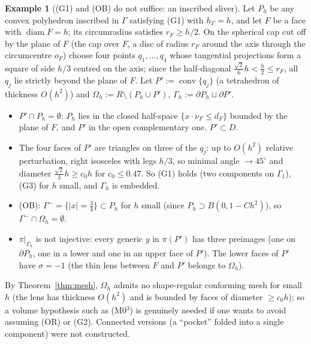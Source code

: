 \documentclass[11pt]{article}
\theoremstyle{definition}
\newtheorem{example}[theorem]{Example}
\newcommand{\hG}{h_\Gamma}
\newcommand{\Gh}{\Gamma_h}
\newcommand{\Oh}{\Omega_h}
\DeclareMathOperator{\diam}{diam}
\begin{document}
\begin{example}[(G1) and (OB) do not suffice: an inscribed sliver]\label{ex:sliver}
Let $P_h$ be any convex polyhedron inscribed in $\Gamma$ satisfying (G1) with $\hG=h$, and let $F$ be a face with $\diam F=h$; its circumradius satisfies $r_F\ge h/2$. On the spherical cap cut off by the plane of $F$ (the cap over $F$, a disc of radius $r_F$ around the axis through the circumcentre $o_F$) choose four points $q_1,\dots,q_4$ whose tangential projections form a square of side $h/3$ centred on the axis; since the half-diagonal $\frac{\sqrt2}{6}h<\frac h2\le r_F$, all $q_j$ lie strictly beyond the plane of $F$. Let $P':=\operatorname{conv}\{q_j\}$ (a tetrahedron of thickness $O(h^2)$) and $\Oh:=R\setminus(P_h\cup P')$, $\Gh:=\partial P_h\sqcup\partial P'$.
\begin{itemize}
\item $P'\cap P_h=\emptyset$: $P_h$ lies in the closed half-space $\{x\cdot\nu_F\le d_F\}$ bounded by the plane of $F$, and $P'$ in the open complementary one. $P'\subset D$.
\item The four faces of $P'$ are triangles on three of the $q_j$: up to $O(h^2)$ relative perturbation, right isosceles with legs $h/3$, so minimal angle $\to45^\circ$ and diameter $\frac{\sqrt2}3h\ge c_0h$ for $c_0\le0.47$. So (G1) holds (two components on $\Gamma_1$), (G3) for $h$ small, and $\Gh$ is embedded.
\item (OB): $\Gamma^-=\{|x|=\frac34\}\subset P_h$ for $h$ small (since $P_h\supset B(0,1-Ch^2)$), so $\Gamma^-\cap\Oh=\emptyset$.
\item $\pi|_{\Gh}$ is not injective: every generic $y$ in $\pi(P')$ has three preimages (one on $\partial P_h$, one in a lower and one in an upper face of $P'$). The lower faces of $P'$ have $\sigma=-1$ (the thin lens between $F$ and $P'$ belongs to $\Oh$).
\end{itemize}
By Theorem~\ref{thm:mesh}, $\Oh$ admits no shape-regular conforming mesh for small $h$ (the lens has thickness $O(h^2)$ and is bounded by faces of diameter $\ge c_0h$); so a volume hypothesis such as (M0$^3$) is genuinely needed if one wants to avoid assuming (OR) or (G2). Connected versions (a ``pocket'' folded into a single component) were not constructed.
\end{example}
\end{document}
